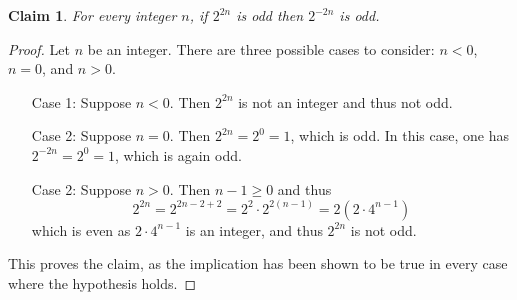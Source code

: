 \documentclass[11pt]{article}
\theoremstyle{plain}
\newtheorem*{claim}{Claim}
\theoremstyle{plain}
\theoremstyle{remark}
\begin{document}
\begin{tcolorbox}
\begin{claim}
 For every integer $n$, if $2^{2n}$ is odd then $2^{-2n}$ is odd.
\end{claim}
\end{tcolorbox}
\begin{proof}
 Let $n$ be an integer. There are three possible cases to consider: $n<0$, $n=0$, and $n>0$.
 \begin{itemize}
\setlength{\itemindent}{2em}
 \item[Case 1:] Suppose $n<0$. Then $2^{2n}$ is not an integer and thus not odd.
 \item[Case 2:] Suppose $n=0$. Then $2^{2n}=2^0 = 1$, which is odd. In this case, one has  $2^{-2n} = 2^0 =1$, which is again odd.
\item[Case 2:] Suppose $n>0$. Then $n-1\geq0$ and thus 
\[2^{2n} = 2^{2n-2+2} = 2^2\cdot 2^{2(n-1)}  = 2(2\cdot 4^{n-1})\]
which is even as $2\cdot 4^{n-1}$ is an integer, and thus $2^{2n}$ is not odd.
 \end{itemize}
 This proves the claim, as the implication has been shown to be true in every case where the hypothesis holds.
\end{proof}
\end{document}

